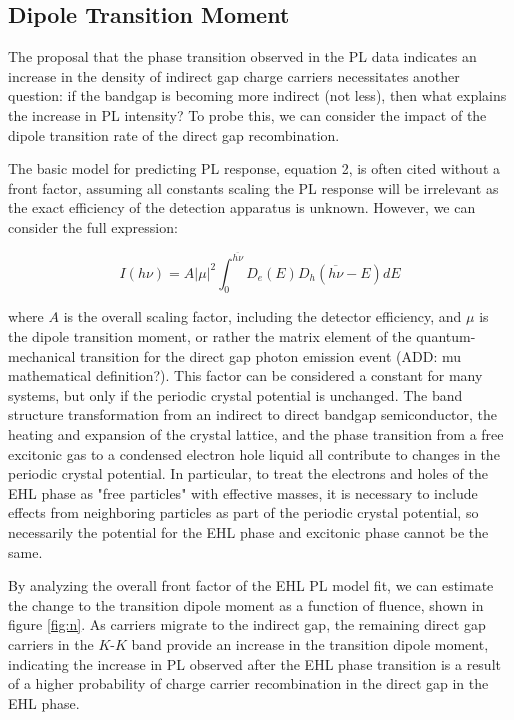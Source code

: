 \documentclass[aps,prl,preprint,superscriptaddress]{revtex4-2}
\begin{document}
\subsection{Dipole Transition Moment}

The proposal that the phase transition observed in the PL data indicates an increase in the density of indirect gap charge carriers necessitates another question: if the bandgap is becoming more indirect (not less), then what explains the increase in PL intensity? To probe this, we can consider the impact of the dipole transition rate of the direct gap recombination.

The basic model for predicting PL response, equation 2, is often cited without a front factor, assuming all constants scaling the PL response will be irrelevant as the exact efficiency of the detection apparatus is unknown. However, we can consider the full expression:

\begin{equation} \label{PL Intensity}
I(h\nu) = A |\mu|^2 \int_0^{\overline{h\nu}} D_e(E) D_h(\overline{h\nu} - E) dE
\end{equation}


where $A$ is the overall scaling factor, including the detector efficiency, and $\mu$ is the dipole transition moment, or rather the matrix element of the quantum-mechanical transition for the direct gap photon emission event (ADD: mu mathematical definition?). This factor can be considered a constant for many systems, but only if the periodic crystal potential is unchanged. The band structure transformation from an indirect to direct bandgap semiconductor, the heating and expansion of the crystal lattice, and the phase transition from a free excitonic gas to a condensed electron hole liquid all contribute to changes in the periodic crystal potential. In particular, to treat the electrons and holes of the EHL phase as "free particles" with effective masses, it is necessary to include effects from neighboring particles as part of the periodic crystal potential, so necessarily the potential for the EHL phase and excitonic phase cannot be the same.

By analyzing the overall front factor of the EHL PL model fit, we can estimate the change to the transition dipole moment as a function of fluence, shown in figure \ref{fig:n}. As carriers migrate to the indirect gap, the remaining direct gap carriers in the $K$-$K$ band provide an increase in the transition dipole moment, indicating the increase in PL observed after the EHL phase transition is a result of a higher probability of charge carrier recombination in the direct gap in the EHL phase.
\end{document}
